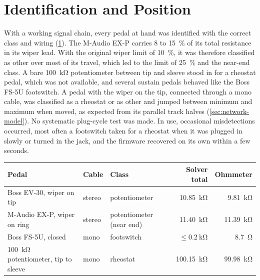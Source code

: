 
\section{Identification and Position}
\label{sec:results-identification}

With a working signal chain, every pedal at hand was identified with the correct class and wiring (\cref{tab:pedals}). The M-Audio EX-P carries 8 to \qty{15}{\percent} of its total resistance in its wiper lead. With the original wiper limit of \qty{10}{\percent}, it was therefore classified as other over most of its travel, which led to the limit of \qty{25}{\percent} and the near-end class. A bare \qty{100}{\kilo\ohm} potentiometer between tip and sleeve stood in for a rheostat pedal, which was not available, and several sustain pedals behaved like the Boss FS-5U footswitch. A pedal with the wiper on the tip, connected through a mono cable, was classified as a rheostat or as other and jumped between minimum and maximum when moved, as expected from its parallel track halves (\cref{sec:network-model}). No systematic plug-cycle test was made. In use, occasional misdetections occurred, most often a footswitch taken for a rheostat when it was plugged in slowly or turned in the jack, and the firmware recovered on its own within a few seconds.

\begin{table}[tb]
  \centering
  \footnotesize
  \label{tab:pedals}
  \begin{tabularx}{\linewidth}{@{}>{\raggedright\arraybackslash}X l l r r@{}}
    \toprule
    \textbf{Pedal} & \textbf{Cable} & \textbf{Class} & \textbf{Solver total} & \textbf{Ohmmeter} \\
    \midrule
    Boss EV-30, wiper on tip & stereo & potentiometer & \qty{10.85}{\kilo\ohm} & \qty{9.81}{\kilo\ohm} \\
    M-Audio EX-P, wiper on ring & stereo & potentiometer (near end) & \qty{11.40}{\kilo\ohm} & \qty{11.39}{\kilo\ohm} \\
    Boss FS-5U, closed & mono & footswitch & $\leq \qty{0.2}{\kilo\ohm}$ & \qty{8.7}{\ohm} \\
    \qty{100}{\kilo\ohm} potentiometer, tip to sleeve & mono & rheostat & \qty{100.15}{\kilo\ohm} & \qty{99.98}{\kilo\ohm} \\
    \bottomrule
  \end{tabularx}
\end{table}

